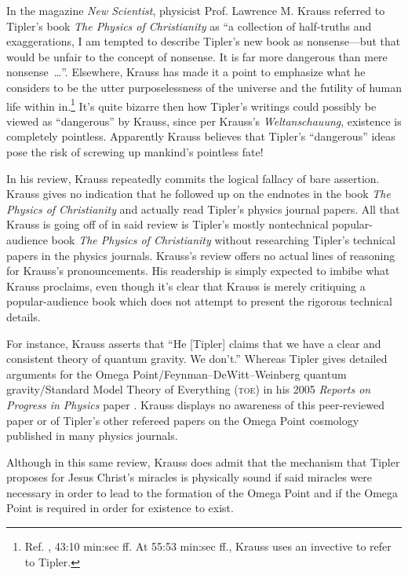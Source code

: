 \documentclass[letterpaper,12pt]{article}
\begin{document}
In the magazine \emph{New Scientist}, physicist Prof. Lawrence M. Krauss \cite{Krauss2007} referred to Tipler's book \emph{The Physics of Christianity} as ``a collection of half-truths and exaggerations, I am tempted to describe Tipler's new book as nonsense---but that would be unfair to the concept of nonsense. It is far more dangerous than mere nonsense~\ldots''. Elsewhere, Krauss has made it a point to emphasize what he considers to be the utter purposelessness of the universe and the futility of human life within in.\footnote{Ref. , 43:10 min:sec ff. At 55:53 min:sec ff., Krauss uses an invective to refer to Tipler.} It's quite bizarre then how Tipler's writings could possibly be viewed as ``dangerous'' by Krauss, since per Krauss's \emph{Weltanschauung}, existence is completely pointless. Apparently Krauss believes that Tipler's ``dangerous'' ideas pose the risk of screwing up mankind's pointless fate!

In his review, Krauss repeatedly commits the logical fallacy of bare assertion. Krauss gives no indication that he followed up on the endnotes in the book \emph{The Physics of Christianity} and actually read Tipler's physics journal papers. All that Krauss is going off of in said review is Tipler's mostly nontechnical popular-audience book \emph{The Physics of Christianity} without researching Tipler's technical papers in the physics journals. Krauss's review offers no actual lines of reasoning for Krauss's pronouncements. His readership is simply expected to imbibe what Krauss proclaims, even though it's clear that Krauss is merely critiquing a popular-audience book which does not attempt to present the rigorous technical details.

For instance, Krauss asserts that ``He [Tipler] claims that we have a clear and consistent theory of quantum gravity. We don't.'' Whereas Tipler gives detailed arguments for the Omega Point\slash Feynman--DeWitt--Weinberg quantum gravity\slash Standard Model Theory of Everything (\textsc{toe}) in his 2005 \emph{Reports on Progress in Physics} paper \cite{Tipler2005}. Krauss displays no awareness of this peer-reviewed paper or of Tipler's other refereed papers on the Omega Point cosmology published in many physics journals.

Although in this same review, Krauss does admit that the mechanism that Tipler proposes for Jesus Christ's \glspl{miracle} is physically sound if said miracles were necessary in order to lead to the formation of the Omega Point and if the Omega Point is required in order for existence to exist.
\end{document}
